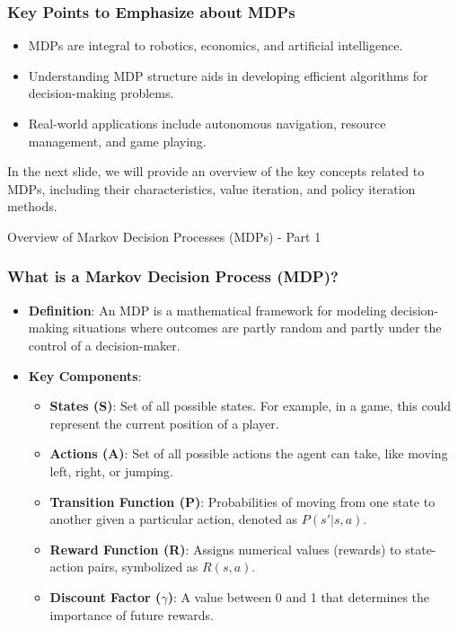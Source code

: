\documentclass[aspectratio=169]{beamer}
\begin{document}
\begin{frame}[fragile]
    \frametitle{Key Points to Emphasize about MDPs}
    \begin{itemize}
        \item MDPs are integral to robotics, economics, and artificial intelligence.
        \item Understanding MDP structure aids in developing efficient algorithms for decision-making problems.
        \item Real-world applications include autonomous navigation, resource management, and game playing.
    \end{itemize}
    In the next slide, we will provide an overview of the key concepts related to MDPs, including their characteristics, value iteration, and policy iteration methods.
\end{frame}

\begin{frame}[fragile]{Overview of Markov Decision Processes (MDPs) - Part 1}
    \frametitle{What is a Markov Decision Process (MDP)?}
    \begin{itemize}
        \item \textbf{Definition}: An MDP is a mathematical framework for modeling decision-making situations where outcomes are partly random and partly under the control of a decision-maker.
        \item \textbf{Key Components}:
        \begin{itemize}
            \item \textbf{States (S)}: Set of all possible states. For example, in a game, this could represent the current position of a player.
            \item \textbf{Actions (A)}: Set of all possible actions the agent can take, like moving left, right, or jumping.
            \item \textbf{Transition Function (P)}: Probabilities of moving from one state to another given a particular action, denoted as \(P(s'|s, a)\).
            \item \textbf{Reward Function (R)}: Assigns numerical values (rewards) to state-action pairs, symbolized as \(R(s, a)\).
            \item \textbf{Discount Factor (\(\gamma\))}: A value between 0 and 1 that determines the importance of future rewards.
        \end{itemize}
    \end{itemize}
\end{frame}
\end{document}
